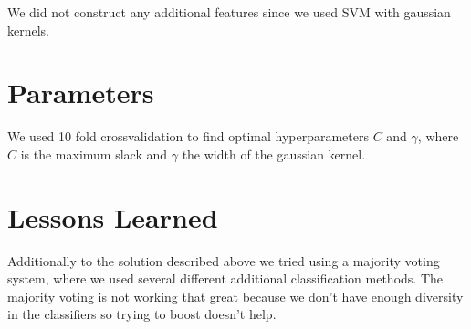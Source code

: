 \documentclass[a4paper, 11pt]{article}
\begin{document}
We did not construct any additional features since we used SVM with gaussian
kernels.

\section{Parameters}

We used 10 fold crossvalidation to find optimal hyperparameters $C$ and $\gamma$,
where $C$ is the maximum slack and $\gamma$ the width of the gaussian kernel.

\section{Lessons Learned}

Additionally to the solution described above we tried using a majority voting
system, where we used several different additional classification methods.
The majority voting is not working that great because we don't have enough diversity in the classifiers so trying to boost doesn't help.
\end{document}

